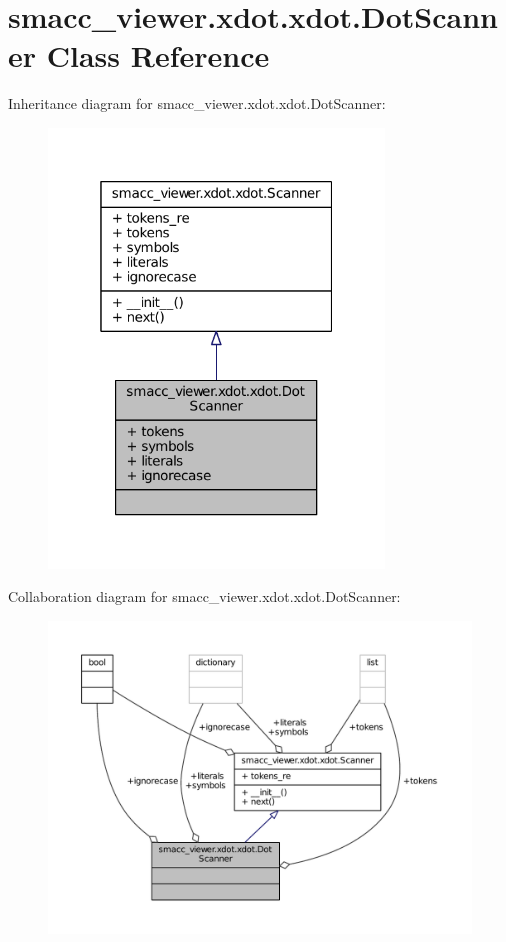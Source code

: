 \hypertarget{classsmacc__viewer_1_1xdot_1_1xdot_1_1DotScanner}{}\section{smacc\+\_\+viewer.\+xdot.\+xdot.\+Dot\+Scanner Class Reference}
\label{classsmacc__viewer_1_1xdot_1_1xdot_1_1DotScanner}


Inheritance diagram for smacc\+\_\+viewer.\+xdot.\+xdot.\+Dot\+Scanner\+:
\nopagebreak
\begin{figure}[H]
\begin{center}
\leavevmode
\includegraphics[width=253pt]{classsmacc__viewer_1_1xdot_1_1xdot_1_1DotScanner__inherit__graph}
\end{center}
\end{figure}


Collaboration diagram for smacc\+\_\+viewer.\+xdot.\+xdot.\+Dot\+Scanner\+:
\nopagebreak
\begin{figure}[H]
\begin{center}
\leavevmode
\includegraphics[width=350pt]{classsmacc__viewer_1_1xdot_1_1xdot_1_1DotScanner__coll__graph}
\end{center}
\end{figure}
